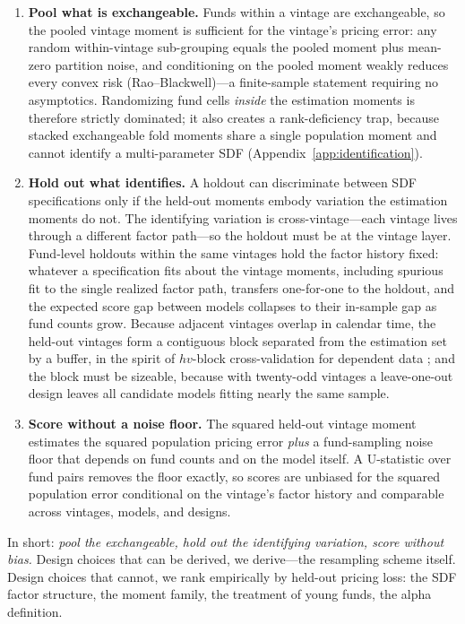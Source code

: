 \documentclass[11pt]{article}
\begin{document}
\begin{enumerate}
\item \textbf{Pool what is exchangeable.} Funds within a vintage are exchangeable, so the pooled vintage moment is sufficient for the vintage's pricing error: any random within-vintage sub-grouping equals the pooled moment plus mean-zero partition noise, and conditioning on the pooled moment weakly reduces every convex risk (Rao--Blackwell)---a finite-sample statement requiring no asymptotics. Randomizing fund cells \emph{inside} the estimation moments is therefore strictly dominated; it also creates a rank-deficiency trap, because stacked exchangeable fold moments share a single population moment and cannot identify a multi-parameter SDF (Appendix~\ref{app:identification}).
\item \textbf{Hold out what identifies.} A holdout can discriminate between SDF specifications only if the held-out moments embody variation the estimation moments do not. The identifying variation is cross-vintage---each vintage lives through a different factor path---so the holdout must be at the vintage layer. Fund-level holdouts within the same vintages hold the factor history fixed: whatever a specification fits about the vintage moments, including spurious fit to the single realized factor path, transfers one-for-one to the holdout, and the expected score gap between models collapses to their in-sample gap as fund counts grow. Because adjacent vintages overlap in calendar time, the held-out vintages form a contiguous block separated from the estimation set by a buffer, in the spirit of \(hv\)-block cross-validation for dependent data \citep{Racine2000}; and the block must be sizeable, because with twenty-odd vintages a leave-one-out design leaves all candidate models fitting nearly the same sample.
\item \textbf{Score without a noise floor.} The squared held-out vintage moment estimates the squared population pricing error \emph{plus} a fund-sampling noise floor that depends on fund counts and on the model itself. A U-statistic over fund pairs removes the floor exactly, so scores are unbiased for the squared population error conditional on the vintage's factor history and comparable across vintages, models, and designs.
\end{enumerate}

In short: \emph{pool the exchangeable, hold out the identifying variation, score without bias.} Design choices that can be derived, we derive---the resampling scheme itself. Design choices that cannot, we rank empirically by held-out pricing loss: the SDF factor structure, the moment family, the treatment of young funds, the alpha definition.
\end{document}
